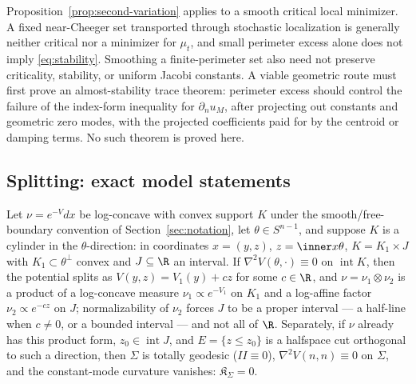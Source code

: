 \documentclass[../../main.tex]{subfiles}
\begin{document}
\begin{remark}
\label{rem:almost-stability-gap}
Proposition~\ref{prop:second-variation} applies to a smooth critical local minimizer. A fixed
near-Cheeger set transported through stochastic localization is generally neither critical nor a
minimizer for $\mu_t$, and small perimeter excess alone does not imply
\eqref{eq:stability}. Smoothing a finite-perimeter set also need not preserve criticality,
stability, or uniform Jacobi constants. A viable geometric route must first prove an
almost-stability trace theorem: perimeter excess should control the failure of the index-form
inequality for $\partial_nu_M$, after projecting out constants and geometric zero modes, with
the projected coefficients paid for by the centroid or damping terms. No such theorem is proved
here.
\end{remark}

\subsection{Splitting: exact model statements}

\begin{proposition}
\label{prop:exact-splitting}
Let $\nu=e^{-V}dx$ be log-concave with convex support $K$ under the smooth/free-boundary
convention of Section~\ref{sec:notation}, let $\theta\in S^{n-1}$, and suppose
$K$ is a cylinder in the $\theta$-direction: in coordinates $x=(y,z)$, $z=\inner x\theta$,
$K=K_1\times J$ with $K_1\subset\theta^\perp$ convex and $J\subseteq\R$ an interval. If
$\nabla^2V(\theta,\cdot)\equiv0$ on $\operatorname{int}K$, then the potential splits as
$V(y,z)=V_1(y)+cz$ for some $c\in\R$, and $\nu=\nu_1\otimes\nu_2$ is a product of a log-concave
measure $\nu_1\propto e^{-V_1}$ on $K_1$ and a log-affine factor $\nu_2\propto e^{-cz}$ on $J$;
normalizability of $\nu_2$ forces $J$ to be a proper interval --- a half-line when $c\ne0$, or a
bounded interval --- and not all of $\R$. Separately, if $\nu$ already has this product form,
$z_0\in\operatorname{int}J$, and $E=\{z\le z_0\}$ is a halfspace cut
orthogonal to such a direction, then $\Sigma$ is totally geodesic ($II\equiv0$),
$\nabla^2V(n,n)\equiv0$ on $\Sigma$, and the constant-mode curvature vanishes:
$\mathfrak K_\Sigma=0$.
\end{proposition}
\end{document}
